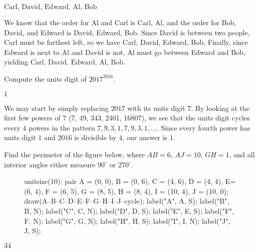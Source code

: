 \documentclass[11pt]{article}
\begin{document}
\begin{answer}
$\boxed{\text{Carl, David, Edward, Al, Bob}}$
\end{answer}

\begin{solution}
We know that the order for Al and Carl is Carl, Al, and the order for Bob, David, and Edward is David, Edward, Bob. Since David is between two people, Carl must be farthest left, so we have Carl, David, Edward, Bob. Finally, since Edward is next to Al and David is not, Al must go between Edward and Bob, yielding $\boxed{\text{Carl, David, Edward, Al, Bob}}$.
\end{solution}


\begin{problem}
Compute the units digit of $2017^{2016}$.
\end{problem}

\begin{answer}
$\boxed{1}$
\end{answer}

\begin{solution}
We may start by simply replacing $2017$ with its units digit $7$. By looking at the first few powers of $7$ (7, 49, 343, 2401, 16807), we see that the units digit cycles every $4$ powers in the pattern $7, 9, 3, 1, 7, 9, 3, 1, \ldots$. Since every fourth power has units digit $1$ and $2016$ is divisible by $4$, our answer is $\boxed{1}$.
\end{solution}


\begin{problem}%
Find the perimeter of the figure below, where $AB = 6$, $AJ = 10$, $GH = 1$, and all interior angles either measure $90^\circ$ or $270^\circ$.
\begin{figure}[h]
	\begin{center}
		\begin{asy}
		unitsize(10);
		pair A = (0, 0), B = (0, 6), C = (4, 6), D = (4, 4), E= (6, 4), F = (6, 5), G = (8, 5), H = (8, 4), I = (10, 4), J = (10, 0);
		draw(A--B--C--D--E--F--G--H--I--J--cycle);
		label("A", A, S);
		label("B", B, N);
		label("C", C, N);
		label("D", D, S);
		label("E", E, S);
		label("F", F, N);
		label("G", G, N);
		label("H", H, S);
		label("I", I, N);
		label("J", J, S);
		\end{asy}
	\end{center}
\end{figure}
\end{problem}

\begin{answer}
$\boxed{34}$
\end{answer}
\end{document}
